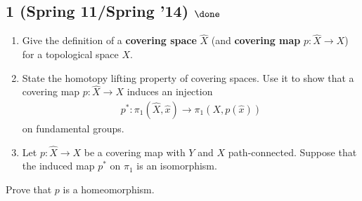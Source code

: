 \hypertarget{spring-11spring-14-done}{%
\subsection{\texorpdfstring{1 (Spring 11/Spring '14)
\(\done\)}{1 (Spring 11/Spring '14) \textbackslash done}}\label{spring-11spring-14-done}}

\begin{enumerate}
\def\labelenumi{\alph{enumi}.}
\item
  Give the definition of a \textbf{covering space} \(\widehat{X}\) (and
  \textbf{covering map} \(p : \widehat{X} \to X\)) for a topological
  space \(X\).
\item
  State the homotopy lifting property of covering spaces. Use it to show
  that a covering map \(p : \widehat{X} \to X\) induces an injection
  \begin{align*}
  p^\ast : \pi_1 (\widehat{X}, \widehat{x}) \to \pi_1 (X, p(\widehat{x}))
  \end{align*}
  on fundamental groups.
\item
  Let \(p : \widehat{X} \to X\) be a covering map with \(Y\) and \(X\)
  path-connected. Suppose that the induced map \(p^\ast\) on \(\pi_1\)
  is an isomorphism.
\end{enumerate}

Prove that \(p\) is a homeomorphism.


